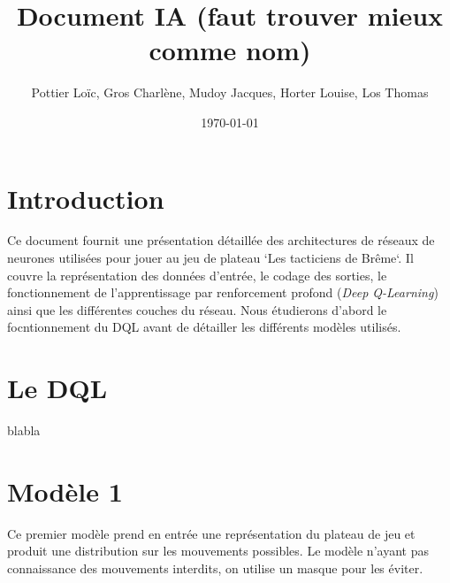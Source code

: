\documentclass[]{article}
\title{\textbf{Document IA (faut trouver mieux comme nom)}} %
\author{Pottier Loïc, Gros Charlène, Mudoy Jacques, Horter Louise, Los Thomas}
\date{\today}
\begin{document}
\maketitle


\section{Introduction}
Ce document fournit une présentation détaillée des architectures de réseaux de neurones utilisées pour jouer au jeu de plateau `Les tacticiens de Brême`. Il couvre la représentation des données d'entrée, le codage des sorties, le fonctionnement de l'apprentissage par renforcement profond (\textit{Deep Q-Learning}) ainsi que les différentes couches du réseau.
Nous étudierons d'abord le focntionnement du DQL avant de détailler les différents modèles utilisés.

\section{Le DQL}
blabla

\section{Modèle 1} %
Ce premier modèle prend en entrée une représentation du plateau de jeu et produit une distribution sur les mouvements possibles.
Le modèle n'ayant pas connaissance des mouvements interdits, on utilise un masque pour les éviter.
\end{document}
